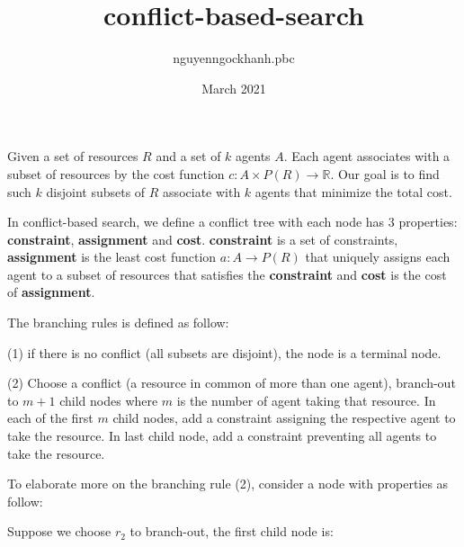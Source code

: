 \documentclass{article}
\title{conflict-based-search}
\author{nguyenngockhanh.pbc }
\date{March 2021}
\begin{document}
\maketitle

    Given a set of resources $R$ and a set of  $k$ agents $A$. Each agent associates with a subset of resources by the cost function $c: A \times P(R) \to \mathbb{R}$. Our goal is to find such $k$ disjoint subsets of $R$ associate with $k$ agents that minimize the total cost. 

    In conflict-based search, we define a conflict tree with each node has 3 properties: \textbf{constraint}, \textbf{assignment} and \textbf{cost}. \textbf{constraint} is a set of constraints, \textbf{assignment} is the least cost function $a: A \to P(R)$ that uniquely assigns each agent to a subset of resources that satisfies the \textbf{constraint} and \textbf{cost} is the cost of \textbf{assignment}.
    
    The branching rules is defined as follow:
    
    (1) if there is no conflict (all subsets are disjoint), the node is a terminal node.
    
    (2) Choose a conflict (a resource in common of more than one agent), branch-out to $m+1$ child nodes where $m$ is the number of agent taking that resource. In each of the first $m$ child nodes, add a constraint assigning the respective agent to take the resource. In last child node, add a constraint preventing all agents to take the resource.
    
    To elaborate more on the branching rule (2), consider a node with properties as follow:
    
    
    
    Suppose we choose $r_2$ to branch-out, the first child node is:
    
\end{document}
